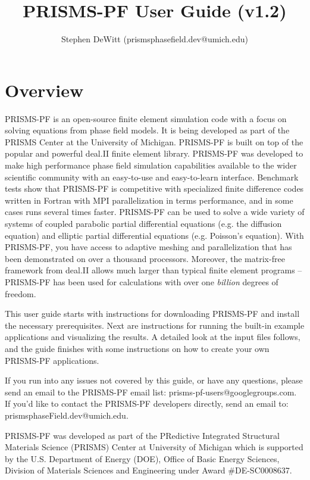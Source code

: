 \documentclass[10pt]{article} %
\title{PRISMS-PF User Guide (v1.2)}
\author{Stephen DeWitt (prismsphasefield.dev@umich.edu)}
\begin{document}
\maketitle

\tableofcontents

\clearpage

\section{Overview}
PRISMS-PF is an open-source finite element simulation code with a focus on solving equations from phase field models. It is being developed as part of the PRISMS Center at the University of Michigan. PRISMS-PF is built on top of the popular and powerful deal.II finite element library. PRISMS-PF was developed to make high performance phase field simulation capabilities available to the wider scientific community with an easy-to-use and easy-to-learn interface. Benchmark tests show that PRISMS-PF is competitive with specialized finite difference codes written in Fortran with MPI parallelization in terms performance,  and in some cases runs several times faster. PRISMS-PF can be used to solve a wide variety of systems of coupled parabolic partial differential equations (e.g. the diffusion equation) and elliptic partial differential equations (e.g. Poisson's equation). With PRISMS-PF, you have access to adaptive meshing and parallelization that has been demonstrated on over a thousand processors. Moreover, the matrix-free framework from deal.II allows much larger than typical finite element programs -- PRISMS-PF has been used for calculations with over one \emph{billion} degrees of freedom.

This user guide starts with instructions for downloading PRISMS-PF and install the necessary prerequisites. Next are instructions for running the built-in example applications and visualizing the results. A detailed look at the input files follows, and the guide finishes with some instructions on how to create your own PRISMS-PF applications.

If you run into any issues not covered by this guide, or have any questions, please send an email to the PRISMS-PF email list: prisms-pf-users@googlegroups.com. If you'd like to contact the PRISMS-PF developers directly, send an email to: prismsphaseField.dev@umich.edu.

PRISMS-PF was developed as part of the PRedictive Integrated Structural Materials Science (PRISMS) Center at University of Michigan which is supported by the U.S. Department of Energy (DOE), Office of Basic Energy Sciences, Division of Materials Sciences and Engineering under Award \#DE-SC0008637.
\end{document}
